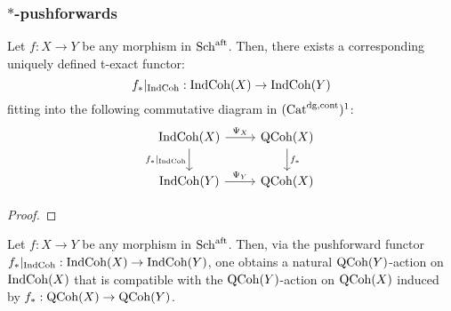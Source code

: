            \subsubsection{\texorpdfstring{$*$}{}-pushforwards}
                \begin{proposition} \label{prop: indcoh_*_pushforwards}
                    Let $f: X \to Y$ be any morphism in $\mathrm{Sch}^{\mathrm{aft}}$. Then, there exists a corresponding uniquely defined t-exact functor:
                        $$f_*|_{\mathrm{Ind}\mathrm{Coh}}: \mathrm{Ind}\mathrm{Coh}(X) \to \mathrm{Ind}\mathrm{Coh}(Y)$$
                    fitting into the following commutative diagram in $(\mathrm{Cat}^{\mathrm{dg}, \mathrm{cont}})^1$:
                        $$
                            \begin{tikzcd}
                            	{\Ind\Coh(X)} & {\QCoh(X)} \\
                            	{\Ind\Coh(Y)} & {\QCoh(X)}
                            	\arrow["{\Psi_X}", from=1-1, to=1-2]
                            	\arrow["{f_*|_{\Ind\Coh}}"', from=1-1, to=2-1]
                            	\arrow["{f_*}", from=1-2, to=2-2]
                            	\arrow["{\Psi_Y}", from=2-1, to=2-2]
                            \end{tikzcd}
                        $$
                \end{proposition}
                    \begin{proof}
                        
                    \end{proof}
                \begin{corollary} \label{coro: *_pushforwards_and_qcoh_actions}
                    Let $f: X \to Y$ be any morphism in $\mathrm{Sch}^{\mathrm{aft}}$. Then, via the pushforward functor $f_*|_{\mathrm{Ind}\mathrm{Coh}}: \mathrm{Ind}\mathrm{Coh}(X) \to \mathrm{Ind}\mathrm{Coh}(Y)$, one obtains a natural $\mathrm{QCoh}(Y)$-action on $\mathrm{Ind}\mathrm{Coh}(X)$ that is compatible with the $\mathrm{QCoh}(Y)$-action on $\mathrm{QCoh}(X)$ induced by $f_*: \mathrm{QCoh}(X) \to \mathrm{QCoh}(Y)$.
                \end{corollary}
                

